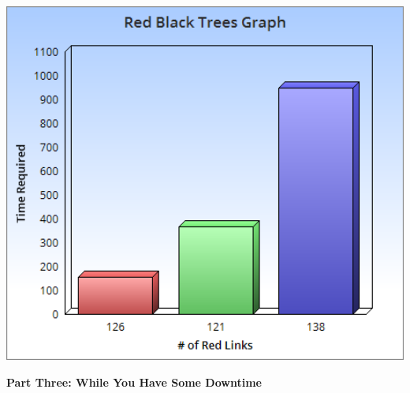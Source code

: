 \documentclass{article}
\begin{document}
\begin{center}
\includegraphics[width=15cm]{ChartGo.png}
\end{center}
\newpage
\begin{center}
\textbf{Part Three: While You Have Some Downtime}
\end{center}
\end{document}
